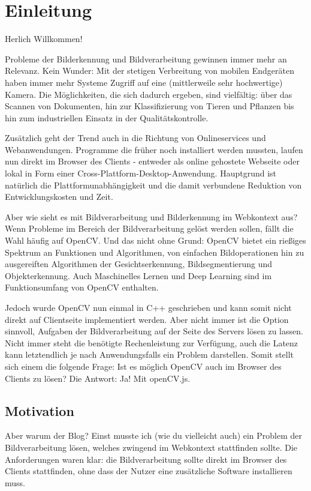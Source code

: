 \section{Einleitung}
Herlich Willkommen! 

Probleme der Bilderkennung und Bildverarbeitung gewinnen immer mehr an Relevanz. Kein Wunder: Mit der stetigen Verbreitung von mobilen Endgeräten haben immer mehr Systeme Zugriff auf eine (mittlerweile sehr hochwertige) Kamera. Die Möglichkeiten, die sich dadurch ergeben, sind vielfältig: über das Scannen von Dokumenten, hin zur Klassifizierung von Tieren und Pflanzen bis hin zum industriellen Einsatz in der Qualitätskontrolle.

Zusätzlich geht der Trend auch in die Richtung von Onlineservices und Webanwendungen. Programme die früher noch installiert werden mussten, laufen nun direkt im Browser des Clients - entweder als online gehostete Webseite oder lokal in Form einer Cross-Plattform-Desktop-Anwendung. Hauptgrund ist natürlich die Plattformunabhängigkeit und die damit verbundene Reduktion von Entwicklungskosten und Zeit. 

Aber wie sieht es mit Bildverarbeitung und Bilderkennung im Webkontext aus? Wenn Probleme im Bereich der Bildverarbeitung gelöst werden sollen, fällt die Wahl häufig auf OpenCV. Und das nicht ohne Grund: OpenCV bietet ein rießiges Spektrum an Funktionen und Algorithmen, von einfachen Bildoperationen hin zu ausgereiften Algorithmen der Gesichtserkennung, Bildsegmentierung und Objekterkennung. Auch Maschinelles Lernen und Deep Learning sind im Funktionsumfang von OpenCV enthalten. 

Jedoch wurde OpenCV nun einmal in C++ geschrieben und kann somit nicht direkt auf Clientseite implementiert werden. Aber nicht immer ist die Option sinnvoll, Aufgaben der Bildverarbeitung auf der Seite des Servers lösen zu lassen. Nicht immer steht die benötigte Rechenleistung zur Verfügung, auch die Latenz kann letztendlich je nach Anwendungsfalls ein Problem darstellen. Somit stellt sich einem die folgende Frage: Ist es möglich OpenCV auch im Browser des Clients zu lösen? Die Antwort: Ja! Mit openCV.js.

\subsection{Motivation}
Aber warum der Blog? Einst musste ich (wie du vielleicht auch) ein Problem der Bildverarbeitung lösen, welches zwingend im Webkontext stattfinden sollte. Die Anforderungen waren klar: die Bildverarbeitung sollte direkt im Browser des Clients stattfinden, ohne dass der Nutzer eine zusätzliche Software installieren muss. 

